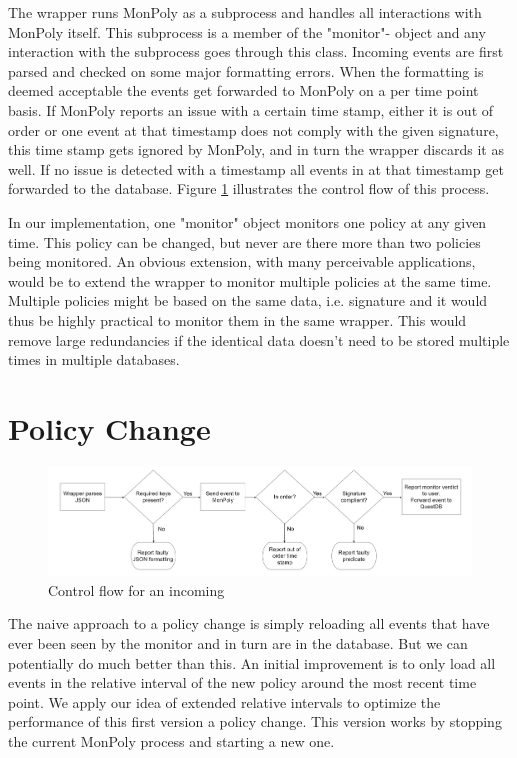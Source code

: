 The wrapper runs MonPoly as a subprocess and handles all interactions with MonPoly itself.
This subprocess is a member of the "monitor"- object and any interaction with the subprocess goes through this class.
Incoming events are first parsed and checked on some major formatting errors.
When the formatting is deemed acceptable the events get forwarded to MonPoly on a per time point basis.
If MonPoly reports an issue with a certain time stamp, either it is out of order or one event at that timestamp does not comply with the given signature, this time stamp gets ignored by MonPoly, and in turn the wrapper discards it as well.
If no issue is detected with a timestamp all events in at that timestamp get forwarded to the database.
Figure \ref{fig:flowchart} illustrates the control flow of this process.

In our implementation, one "monitor" object monitors one policy at any given time.
This policy can be changed, but never are there more than two policies being monitored.
An obvious extension, with many perceivable applications, would be to extend the wrapper to monitor multiple policies at the same time.
Multiple policies might be based on the same data, i.e. signature and it would thus be highly practical to monitor them in the same wrapper.
This would remove large redundancies if the identical data doesn't need to be stored multiple times in multiple databases.


\section{Policy Change}
% 

\begin{figure}
    \label{fig:flowchart}
    \centering
    \includegraphics[width=\linewidth]{diagrams/flowchart-2.png}
    \caption{Control flow for an incoming}
\end{figure}

The naive approach to a policy change is simply reloading all events that have ever been seen by the monitor and in turn are in the database.
But we can potentially do much better than this.
An initial improvement is to only load all events in the relative interval of the new policy around the most recent time point.
We apply our idea of extended relative intervals to optimize the performance of this first version a policy change.
This version works by stopping the current MonPoly process and starting a new one.


